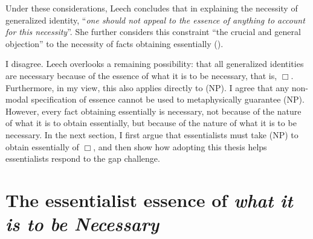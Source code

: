 \documentclass[12pt]{article}
\begin{document}
Under these considerations, Leech concludes that in explaining the necessity of generalized identity, ``\textit{one should not appeal to the essence of anything to account for this necessity}''. She further considers this constraint ``the crucial and general objection'' to the necessity of facts obtaining essentially (\citeyear[902]{Leech2021-LEEFET-2}). 
\par 
I disagree. Leech overlooks a remaining possibility: that all generalized identities are necessary because of the essence of what it is to be necessary, that is, $\Box$. Furthermore, in my view, this also applies directly to (NP). I agree that any non-modal specification of essence cannot be used to metaphysically guarantee (NP). However, every fact obtaining essentially is necessary, not because of the nature of what it is to obtain essentially, but because of the nature of what it is to be necessary. In the next section, I first argue that essentialists must take (NP) to obtain essentially of $\Box$, and then show how adopting this thesis helps essentialists respond to the gap challenge. 

\section{The essentialist essence of \textit{what it is to be Necessary}} %
\end{document}
